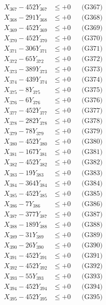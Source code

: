 \documentclass[a4paper,10pt]{article}
\begin{document}
{\begin{align}
X_{367} - 452Y_{367} &\leq +0 && \text{(G367)} \\
X_{368} - 291Y_{368} &\leq +0 && \text{(G368)} \\
X_{369} - 452Y_{369} &\leq +0 && \text{(G369)} \\
X_{370} - 452Y_{370} &\leq +0 && \text{(G370)} \\
\allowbreak
X_{371} - 306Y_{371} &\leq +0 && \text{(G371)} \\
X_{372} - 65Y_{372} &\leq +0 && \text{(G372)} \\
X_{373} - 389Y_{373} &\leq +0 && \text{(G373)} \\
X_{374} - 439Y_{374} &\leq +0 && \text{(G374)} \\
X_{375} - 8Y_{375} &\leq +0 && \text{(G375)} \\
X_{376} - 6Y_{376} &\leq +0 && \text{(G376)} \\
X_{377} - 452Y_{377} &\leq +0 && \text{(G377)} \\
X_{378} - 282Y_{378} &\leq +0 && \text{(G378)} \\
X_{379} - 78Y_{379} &\leq +0 && \text{(G379)} \\
X_{380} - 452Y_{380} &\leq +0 && \text{(G380)} \\
\allowbreak
X_{381} - 167Y_{381} &\leq +0 && \text{(G381)} \\
X_{382} - 452Y_{382} &\leq +0 && \text{(G382)} \\
X_{383} - 19Y_{383} &\leq +0 && \text{(G383)} \\
X_{384} - 364Y_{384} &\leq +0 && \text{(G384)} \\
X_{385} - 452Y_{385} &\leq +0 && \text{(G385)} \\
X_{386} - 7Y_{386} &\leq +0 && \text{(G386)} \\
X_{387} - 377Y_{387} &\leq +0 && \text{(G387)} \\
X_{388} - 189Y_{388} &\leq +0 && \text{(G388)} \\
X_{389} - 31Y_{389} &\leq +0 && \text{(G389)} \\
X_{390} - 26Y_{390} &\leq +0 && \text{(G390)} \\
\allowbreak
X_{391} - 452Y_{391} &\leq +0 && \text{(G391)} \\
X_{392} - 452Y_{392} &\leq +0 && \text{(G392)} \\
X_{393} - 55Y_{393} &\leq +0 && \text{(G393)} \\
X_{394} - 452Y_{394} &\leq +0 && \text{(G394)} \\
X_{395} - 452Y_{395} &\leq +0 && \text{(G395)} \\

\end{align}}
\end{document}
